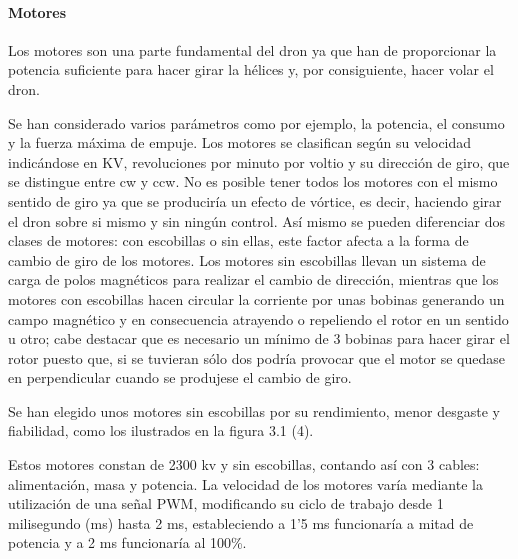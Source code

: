 
\paragraph{Motores}
\label{SSS:Motores}

Los motores son una parte fundamental del dron ya que han de proporcionar la potencia suficiente para hacer girar la hélices y, por consiguiente, hacer volar el dron. 
                
 Se han considerado varios parámetros como por ejemplo, la potencia, el consumo y la fuerza máxima de empuje. 
 Los motores se clasifican según su velocidad indicándose en KV, revoluciones por minuto por voltio y su dirección de giro, que se distingue entre \ac{cw} y \ac{ccw}. No es posible tener todos los motores con el mismo sentido de giro ya que se produciría un efecto de vórtice, es decir, haciendo girar el dron sobre si mismo y sin ningún control. \linebreak Así mismo se pueden diferenciar dos clases de motores: con escobillas o sin ellas, este factor afecta a la forma de cambio de giro de los motores. Los motores sin escobillas llevan un sistema de carga de polos magnéticos para realizar el cambio de dirección, mientras que los motores con escobillas hacen circular la corriente por unas bobinas generando un campo magnético y en consecuencia atrayendo o repeliendo el rotor en un sentido u otro; cabe destacar que es necesario un mínimo de 3 bobinas para hacer girar el rotor puesto que, si se tuvieran sólo dos podría provocar que el motor se quedase en perpendicular cuando se produjese el cambio de giro.

 Se han elegido unos motores sin escobillas por su rendimiento, menor desgaste y fiabilidad, como los ilustrados en la figura 3.1 (4). 
% 
                
 Estos motores constan de 2300 \ac{kv} y sin escobillas, contando así con 3 cables: alimentación, masa y potencia. La velocidad de los motores varía mediante la utilización de una señal PWM, modificando su ciclo de trabajo desde 1 milisegundo (ms) hasta 2 ms, estableciendo a 1'5 ms funcionaría a mitad de potencia y a 2 ms funcionaría al 100\%.
 
